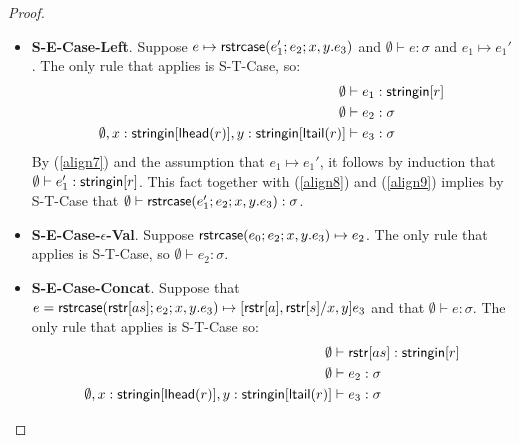 \documentclass[11pt,leqno]{article}
\theoremstyle{definition}
\newcommand{\stringin}[1]{{\sf stringin}[#1]}
\newcommand{\strcase}[3]{ {\sf rstrcase}(#1; #2; #3)}
\newcommand{\lhead}[1]{ {\sf lhead}(#1) }
\newcommand{\ltail}[1]{ {\sf ltail}(#1) }
\begin{document}
\begin{proof}
\begin{itemize}[label=$ $,itemsep=1ex]
\item \textbf{S-E-Case-Left}.
Suppose 
$e \mapsto \strcase{e_1'}{e_2}{x,y.e_3}$
and $\emptyset \vdash e : \sigma$ and $e_1 \mapsto e_1'$.
The only rule that applies is S-T-Case, so:
\begin{align}
\emptyset&\vdash e_1 : \stringin{r} \label{align7} \\
\emptyset&\vdash e_2 : \sigma \label{align8} \\ 
\emptyset, x:\stringin{\lhead{r}}, y : \stringin{\ltail{r}} &\vdash e_3 : \sigma \label{align9}
\end{align}
By (\ref{align7}) and the assumption that $e_1 \mapsto e_1'$, it follows by induction that $\emptyset\vdash e_1' : \stringin{r}$.
This fact together with (\ref{align8}) and (\ref{align9}) implies by S-T-Case that
$\emptyset\vdash\strcase{e_1'}{e_2}{x,y.e_3} : \sigma$.


\item \textbf{S-E-Case-$\epsilon$-Val}.
Suppose $\strcase{e_0}{e_2}{x,y.e_3} \mapsto e_2$. 
The only rule that applies is S-T-Case, so $\emptyset \vdash e_2 : \sigma$. 

\item \textbf{S-E-Case-Concat}.
Suppose that $e = \strcase{\rstr{as}}{e_2}{x,y.e_3} \mapsto [\rstr{a}, \rstr{s} / x,y] e_3$
and that $\emptyset\vdash e : \sigma$.
The only rule that applies is S-T-Case so:
\begin{align}
\emptyset&\vdash \rstr{as} : \stringin{r} \label{align13}\\
\emptyset&\vdash e_2 : \sigma \label{align14} \\ 
\emptyset, x:\stringin{\lhead{r}}, y : \stringin{\ltail{r}} &\vdash e_3 : \sigma \label{align15}
\end{align}


\end{itemize}
\end{proof}
\end{document}
